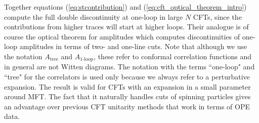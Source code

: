 Together equations (\ref{eq:stcontribution}) and (\ref{eq:cft_optical_theorem_intro})
compute the full double discontinuity at one-loop in large $N$ CFTs, since the contributions from higher traces will start at higher loops. 
 Their analogue is of course the optical theorem for amplitudes which computes discontinuities of one-loop amplitudes in terms of two- and one-line cuts. Note that although we use the notation 
 $A_\text{tree}$ and $A_\text{1-loop}$, these refer to conformal correlation functions and in general are not Witten diagrams. The notation with the terms ``one-loop" and ``tree" for the correlators is used only because we always refer to a perturbative expansion. The result is valid for CFTs with an expansion in a small parameter around MFT. The fact that it naturally handles cuts of spinning particles gives an advantage over previous CFT unitarity methods that work in terms of OPE data.

